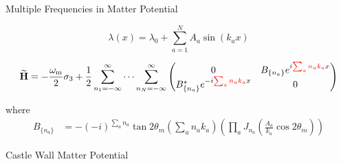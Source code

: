 \documentclass[9pt]{beamer}
\begin{document}
\begin{darkframes}
\begin{frame}{Multiple Frequencies in Matter Potential}




\begin{equation*}
\lambda(x) = \lambda_0 + \sum_{a=1}^N A_a \sin(k_a x )
\end{equation*}


\begin{tcolorbox}[title=Hamiltonian in Rabi Basis]


\begin{equation*}
\mathbf{\widetilde H}= -\frac{\omega_{\mathrm m}}{2}\sigma_3 + \frac{1}{2} \sum_{n_1=-\infty}^\infty \cdots \sum_{n_N=-\infty}^\infty \begin{pmatrix}
0 &  B_{\{n_a\}} e^{i  {\color{red} \sum_a n_a k_a } x}\\
  B_{\{n_a\}}^* e^{ -i  {\color{red} \sum_a n_a k_a } x} & 0
\end{pmatrix}
\end{equation*}


where
\begin{align*}
    B_{\{n_a\}} &= -(-i)^{\sum_a n_a} \tan 2\theta_m \left( \sum_a n_a k_a \right) \left( \prod_a J_{n_a}\left( \frac{A_a}{k_a}\cos 2\theta_m \right) \right)
\end{align*}




\end{tcolorbox}




\end{frame}



\begin{frame}{Castle Wall Matter Potential}



\begin{columns}[T]
\begin{column}{0.5\textwidth}

\end{column}
\end{columns}
\end{frame}
\end{darkframes}
\end{document}
